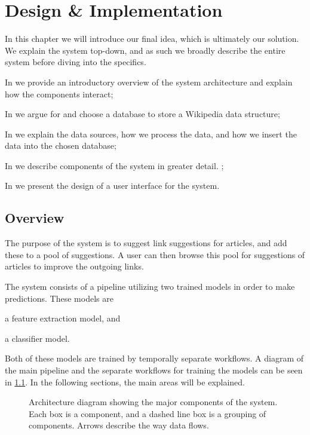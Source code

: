 \chapter{Design \& Implementation}\label{chap:design}
In this chapter we will introduce our final idea, which is ultimately our solution. We explain the system top-down, and as such we broadly describe the entire system before diving into the specifics.

\begin{chapterorganization}
  \item In  we provide an introductory overview of the system architecture and explain how the components interact;
  \item In  we argue for and choose a database to store a Wikipedia data structure;
  \item In  we explain the data sources, how we process the data, and how we insert the data into the chosen database;
  \item In  we describe components of the system in greater detail. ;
  \item In  we present the design of a user interface for the system.
\end{chapterorganization}

\section{Overview}\label{sec:design_overview}
The purpose of the system is to suggest link suggestions for articles, and add these to a pool of suggestions. A user can then browse this pool for suggestions of articles to improve the outgoing links.

The system consists of a pipeline utilizing two trained models in order to make predictions. These models are
\begin{enumerate*}[label=(\roman*)]
  \item a feature extraction model, and
  \item a classifier model.
\end{enumerate*}
Both of these models are trained by temporally separate workflows. A diagram of the main pipeline and the separate workflows for training the models can be seen in \cref{fig:system-overview}. In the following sections, the main areas will be explained.

\begin{figure}[tbp]%
  \centering
  
\caption[Architecture diagram showing the major components of the system]{Architecture diagram showing the major components of the system. Each box is a component, and a dashed line box is a grouping of components. Arrows describe the way data flows.}%
\label{fig:system-overview}%
\end{figure}

